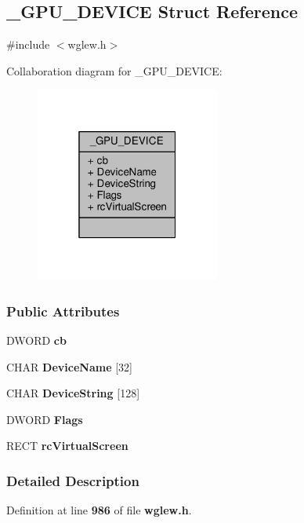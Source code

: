 \subsection{\+\_\+\+G\+P\+U\+\_\+\+D\+E\+V\+I\+CE Struct Reference}
\label{struct__GPU__DEVICE}


{\ttfamily \#include $<$wglew.\+h$>$}



Collaboration diagram for \+\_\+\+G\+P\+U\+\_\+\+D\+E\+V\+I\+CE\+:
\nopagebreak
\begin{figure}[H]
\begin{center}
\leavevmode
\includegraphics[width=172pt]{d2/dcf/struct__GPU__DEVICE__coll__graph}
\end{center}
\end{figure}
\subsubsection*{Public Attributes}
\begin{DoxyCompactItemize}
\item 
D\+W\+O\+RD {\bf cb}
\item 
C\+H\+AR {\bf Device\+Name} [32]
\item 
C\+H\+AR {\bf Device\+String} [128]
\item 
D\+W\+O\+RD {\bf Flags}
\item 
R\+E\+CT {\bf rc\+Virtual\+Screen}
\end{DoxyCompactItemize}


\subsubsection{Detailed Description}


Definition at line {\bf 986} of file {\bf wglew.\+h}.



